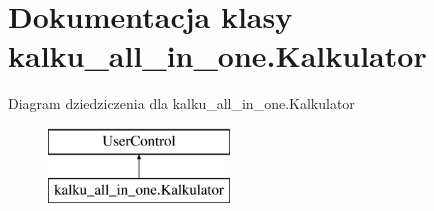 \hypertarget{classkalku__all__in__one_1_1_kalkulator}{}\section{Dokumentacja klasy kalku\+\_\+all\+\_\+in\+\_\+one.\+Kalkulator}
\label{classkalku__all__in__one_1_1_kalkulator}
Diagram dziedziczenia dla kalku\+\_\+all\+\_\+in\+\_\+one.\+Kalkulator\begin{figure}[H]
\begin{center}
\leavevmode
\includegraphics[height=2.000000cm]{classkalku__all__in__one_1_1_kalkulator}
\end{center}
\end{figure}
